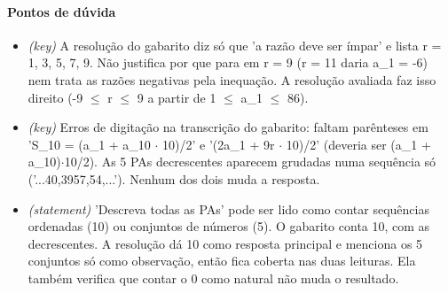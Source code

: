 \documentclass{article}%
\begin{document}
\paragraph{Pontos de dúvida}%
\begin{itemize}%
\item%
\textit{(key)} A resolução do gabarito diz só que 'a razão deve ser ímpar' e lista r = 1, 3, 5, 7, 9. Não justifica por que para em r = 9 (r = 11 daria a\_1 = -6) nem trata as razões negativas pela inequação. A resolução avaliada faz isso direito (-9 $\leq$ r $\leq$ 9 a partir de 1 $\leq$ a\_1 $\leq$ 86).%
\item%
\textit{(key)} Erros de digitação na transcrição do gabarito: faltam parênteses em 'S\_10 = (a\_1 + a\_10 $\cdot$ 10)/2' e '(2a\_1 + 9r $\cdot$ 10)/2' (deveria ser (a\_1 + a\_10)$\cdot$10/2). As 5 PAs decrescentes aparecem grudadas numa sequência só ('...40,3957,54,...'). Nenhum dos dois muda a resposta.%
\item%
\textit{(statement)} 'Descreva todas as PAs' pode ser lido como contar sequências ordenadas (10) ou conjuntos de números (5). O gabarito conta 10, com as decrescentes. A resolução dá 10 como resposta principal e menciona os 5 conjuntos só como observação, então fica coberta nas duas leituras. Ela também verifica que contar o 0 como natural não muda o resultado.%
\end{itemize}%
\end{document}
